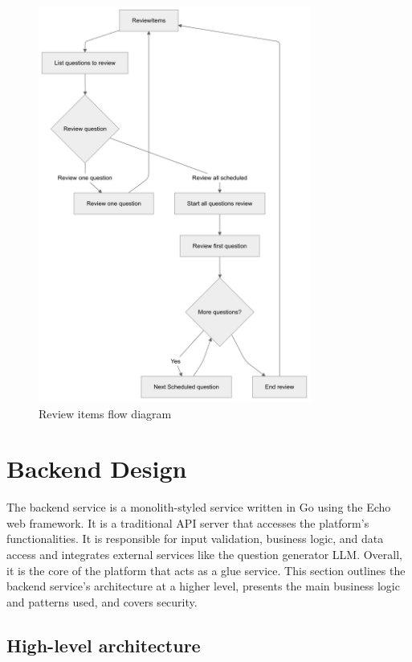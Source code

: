 \begin{figure}[H]
    \centering
    \includegraphics[width=0.8\textwidth, keepaspectratio]{figures/flow-review-item.png}
    \caption{Review items flow diagram}
    \label{fig:flow-review-item}
\end{figure}

\section{Backend Design}

The backend service is a monolith-styled service written in Go using the Echo web framework. It is a traditional API server that accesses the platform's functionalities. It is responsible for input validation, business logic, and data access and integrates external services like the question generator LLM. Overall, it is the core of the platform that acts as a glue service. This section outlines the backend service's architecture at a higher level, presents the main business logic and patterns used, and covers security.

\subsection{High-level architecture}


